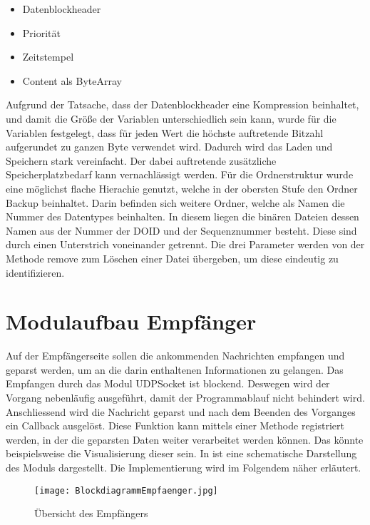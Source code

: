 \begin{itemize}
\item Datenblockheader 
\item Priorität
\item Zeitstempel
\item Content als ByteArray
\end{itemize}

Aufgrund der Tatsache, dass der Datenblockheader eine Kompression beinhaltet,
und damit die Größe der Variablen unterschiedlich sein kann, wurde für die
Variablen festgelegt, dass für jeden Wert die höchste auftretende Bitzahl
aufgerundet zu ganzen Byte verwendet wird. Dadurch wird das Laden und
Speichern stark vereinfacht. Der dabei auftretende zusätzliche
Speicherplatzbedarf kann vernachlässigt werden.
\newline 
Für die Ordnerstruktur wurde eine möglichst flache Hierachie genutzt, welche in
der obersten Stufe den Ordner Backup beinhaltet. Darin befinden sich weitere Ordner, welche
als Namen die Nummer des Datentypes beinhalten. In diesem liegen die binären
Dateien dessen Namen aus der Nummer der DOID und der Sequenznummer besteht.
Diese sind durch einen Unterstrich voneinander getrennt. Die drei Parameter
werden von der Methode remove zum Löschen einer Datei übergeben, um diese
eindeutig zu identifizieren.

\section{Modulaufbau Empfänger}

Auf der Empfängerseite sollen die ankommenden Nachrichten empfangen und geparst
werden, um an die darin enthaltenen Informationen zu gelangen. Das Empfangen
durch das Modul UDPSocket ist blockend. Deswegen wird der Vorgang nebenläufig
ausgeführt, damit der Programmablauf nicht behindert wird. Anschliessend wird
die Nachricht geparst und nach dem Beenden des Vorganges ein Callback ausgelöst.
Diese Funktion kann mittels einer Methode registriert werden, in der die
geparsten Daten weiter verarbeitet werden können. Das könnte beispielsweise die
Visualisierung dieser sein. \newline
In  ist eine schematische
Darstellung des Moduls dargestellt. Die Implementierung wird im Folgendem näher
erläutert.

\begin{figure}[htb]
\centering
\texttt{[image: BlockdiagrammEmpfaenger.jpg]}
\caption{Übersicht des Empfängers}
\label{fig:BlockdiagrammEmpfaenger}
\end{figure}


